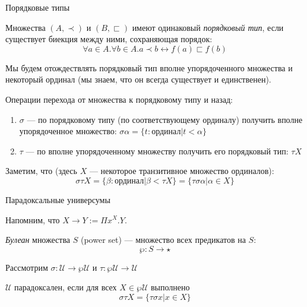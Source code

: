 \documentclass[aspectratio=169,dvipsnames,usenames]{beamer}
\begin{document}
\begin{frame}{Порядковые типы}

\begin{dfn}Множества $(A,\prec)$ и $(B,\sqsubset)$ имеют одинаковый \emph{порядковый тип}, 
если существует биекция между ними, сохраняющая порядок:
\vspace{-0.3cm}
$$\forall a\in A.\forall b \in A.a \prec b \leftrightarrow f(a) \sqsubset f(b)$$
\end{dfn}
\vspace{-0.3cm}

Мы будем отождествлять порядковый тип вполне упорядоченного множества и некоторый ординал
(мы знаем, что он всегда существует и единственен).

\begin{dfn}Операции перехода от множества к порядковому типу и назад:
\begin{enumerate}
\item $\sigma$ --- по порядковому типу (по соответствующему ординалу) получить вполне упорядоченное множество: $\sigma\alpha = \{ t: \text{ординал} | t < \alpha \}$
\item $\tau$ --- по вполне упорядоченному множеству получить его порядковый тип: $\tau X$
\end{enumerate}

Заметим, что (здесь $X$ --- некоторое транзитивное множество ординалов):
 $$\sigma\tau X = \{ \beta : \text{ординал} | \beta < \tau X\} = \{ \tau\sigma\alpha | \alpha \in X \}$$
\end{dfn}

\end{frame}
\begin{frame}{Парадоксальные универсумы}

Напомним, что $X \rightarrow Y := \Pi x^X.Y$.

\begin{dfn}\emph{Булеан} множества $S$ (power set) --- множество всех предикатов на $S$:
$$\wp: S \rightarrow \star$$
\end{dfn}


Рассмотрим $\sigma: \mathcal{U}\rightarrow\wp\mathcal{U}$ и $\tau: \wp\mathcal{U}\rightarrow\mathcal{U}$

\begin{dfn}
$\mathcal{U}$ парадоксален, если для всех $X \in \wp\mathcal{U}$ выполнено $$\sigma\tau X = \{\tau\sigma x | x \in X \}$$
\end{dfn}


\end{frame}
\end{document}
